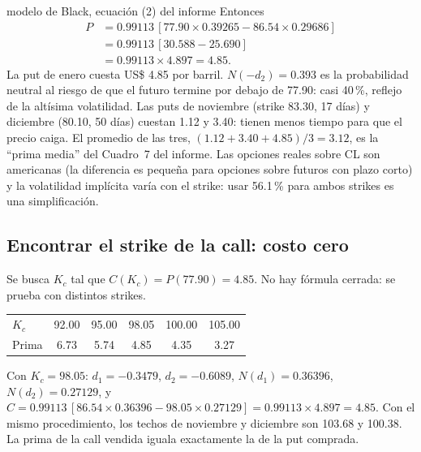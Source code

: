 \begin{ficha}{modelo de Black, ecuación (2) del informe}
Entonces
\begin{align*}
P&=0.99113\,[77.90\times0.39265-86.54\times0.29686]\\
&=0.99113\,[30.588-25.690]\\
&=0.99113\times4.897=4.85.
\end{align*}
 La put de enero cuesta US\$ 4.85 por barril. $N(-d_2)=0.393$ es la probabilidad neutral al riesgo de que el futuro termine por debajo de 77.90: casi 40\,\%, reflejo de la altísima volatilidad. Las puts de noviembre (strike 83.30, 17 días) y diciembre (80.10, 50 días) cuestan 1.12 y 3.40: tienen menos tiempo para que el precio caiga. El promedio de las tres, $(1.12+3.40+4.85)/3=3.12$, es la \enquote{prima media} del Cuadro~7 del informe.
 Las opciones reales sobre CL son americanas (la diferencia es pequeña para opciones sobre futuros con plazo corto) y la volatilidad implícita varía con el strike: usar 56.1\,\% para ambos strikes es una simplificación.
\end{ficha}


\subsection{Encontrar el strike de la call: costo cero}

Se busca $K_c$ tal que $C(K_c)=P(77.90)=4.85$. No hay fórmula cerrada: se prueba con distintos strikes.

\begin{center}\small
{}
\begin{tabular}{@{}lccccc@{}}
\toprule
$K_c$ & 92.00 & 95.00 & 98.05 & 100.00 & 105.00\\
Prima & 6.73 & 5.74 & 4.85 & 4.35 & 3.27\\
\bottomrule
\end{tabular}
\end{center}

Con $K_c=98.05$: $d_1=-0.3479$, $d_2=-0.6089$, $N(d_1)=0.36396$, $N(d_2)=0.27129$, y $C=0.99113\,[86.54\times0.36396-98.05\times0.27129]=0.99113\times4.897=4.85$. Con el mismo procedimiento, los techos de noviembre y diciembre son 103.68 y 100.38. La prima de la call vendida iguala exactamente la de la put comprada.

